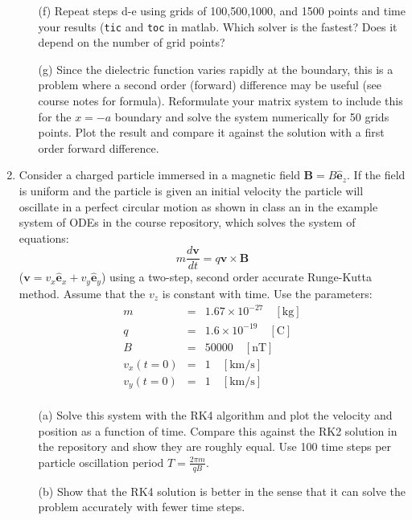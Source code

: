 \documentclass{article}
\begin{document}
\begin{enumerate}
\begin{itemize}
    \item[(f)]  Repeat steps d-e using grids of 100,500,1000, and 1500 points and time your results (\texttt{tic} and \texttt{toc} in matlab.  Which solver is the fastest?  Does it depend on the number of grid points?
    \item[(g)]  Since the dielectric function varies rapidly at the boundary, this is a problem where a second order (forward) difference may be useful (see course notes for formula).  Reformulate your matrix system to include this for the $x=-a$ boundary and solve the system numerically for 50 grids points.  Plot the result and compare it against the solution with a first order forward difference.  
  \end{itemize}
  \item  Consider a charged particle immersed in a magnetic field $\mathbf{B} = B \hat{\mathbf{e}}_z$.  If the field is uniform and the particle is given an initial velocity the particle will oscillate in a perfect circular motion as shown in class an in the example system of ODEs in the course repository, which solves the system of equations:
    \begin{equation}
      m \frac{d \mathbf{v}}{dt} = q \mathbf{v} \times \mathbf{B}
    \end{equation}  
    ($\mathbf{v}=v_x \hat{\mathbf{e}}_x + v_y \hat{\mathbf{e}}_y$) using a two-step, second order accurate Runge-Kutta method.  Assume that the $v_z$ is constant with time.  Use the parameters:  
    \begin{eqnarray}
      m &=& 1.67 \times 10^{-27} \quad \mathrm{[kg]} \\
      q &=& 1.6 \times 10^{-19} \quad \mathrm{[C]} \\
      B &=& 50000 \quad \mathrm{[nT]} \\
      v_x(t=0) &=& 1 \quad \mathrm{[km/s]} \\
      v_y(t=0) &=& 1 \quad \mathrm{[km/s]} \\      
    \end{eqnarray}
  \begin{itemize}
    \item[(a)]  Solve this system with the RK4 algorithm and plot the velocity and position as a function of time.  Compare this against the RK2 solution in the repository and show they are roughly equal.  Use 100 time steps per particle oscillation period $T=\frac{2 \pi m}{q B}$.  
    \item[(b)]  Show that the RK4 solution is better in the sense that it can solve the problem accurately with fewer time steps.  

\end{itemize}
\end{enumerate}
\end{document}
